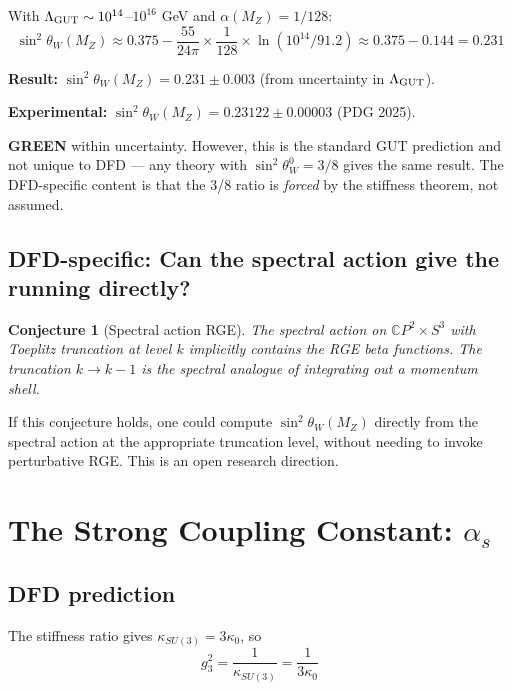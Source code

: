 \documentclass[11pt,a4paper]{article}
\newtheorem{conjecture}{Conjecture}
\newcommand{\GREEN}{\textcolor{dfdgreen}{\textbf{GREEN}}}
\newcommand{\CP}{\mathbb{C}P}
\begin{document}
With $\Lambda_{\rm GUT} \sim 10^{14}$--$10^{16}$ GeV and $\alpha(M_Z) = 1/128$:
\begin{equation}
\sin^2\theta_W(M_Z) \approx 0.375 - \frac{55}{24\pi} \times \frac{1}{128} \times \ln(10^{14}/91.2) \approx 0.375 - 0.144 = 0.231
\end{equation}

\textbf{Result:} $\sin^2\theta_W(M_Z) = 0.231 \pm 0.003$ (from uncertainty in $\Lambda_{\rm GUT}$).

\textbf{Experimental:} $\sin^2\theta_W(M_Z) = 0.23122 \pm 0.00003$ (PDG 2025).

\GREEN{} within uncertainty. However, this is the standard GUT prediction and not unique to DFD --- any theory with $\sin^2\theta_W^0 = 3/8$ gives the same result. The DFD-specific content is that the 3/8 ratio is \emph{forced} by the stiffness theorem, not assumed.

\subsection{DFD-specific: Can the spectral action give the running directly?}

\begin{conjecture}[Spectral action RGE]
\label{conj:spectral-rge}
The spectral action on $\CP^2 \times S^3$ with Toeplitz truncation at level $k$ implicitly contains the RGE beta functions. The truncation $k \to k-1$ is the spectral analogue of integrating out a momentum shell.
\end{conjecture}

If this conjecture holds, one could compute $\sin^2\theta_W(M_Z)$ directly from the spectral action at the appropriate truncation level, without needing to invoke perturbative RGE. This is an open research direction.

\section{The Strong Coupling Constant: $\alpha_s$}

\subsection{DFD prediction}

The stiffness ratio gives $\kappa_{SU(3)} = 3\kappa_0$, so
\begin{equation}
g_3^2 = \frac{1}{\kappa_{SU(3)}} = \frac{1}{3\kappa_0}
\end{equation}
\end{document}
